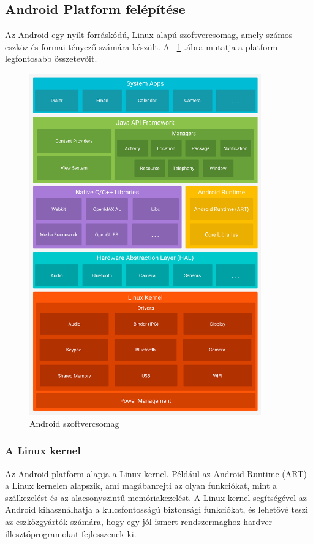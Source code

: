 \documentclass[../main.tex]{subfiles}
\begin{document}
    \subsection{Android Platform felépítése} %
        Az Android egy nyílt forráskódú, Linux alapú szoftvercsomag, amely számos eszköz és formai tényező számára készült. A ~\ref{fig:android_szoftvercsomag} .ábra mutatja a platform legfontosabb összetevőit.
        \begin{figure}[h!]
            \centering
            \includegraphics[width=10cm]{android_res/android_szoftvercsomag.png}
            \caption{Android szoftvercsomag}
            \label{fig:android_szoftvercsomag}
        \end{figure}
        
        \subsubsection{A Linux kernel}
            Az Android platform alapja a Linux kernel. Például az Android Runtime (ART) a Linux kernelen alapszik, ami magábanrejti az olyan funkciókat, mint a szálkezelést és az alacsonyszintű memóriakezelést.
            A Linux kernel segítségével az Android kihasználhatja a kulcsfontosságú biztonsági funkciókat, és lehetővé teszi az eszközgyártók számára, hogy egy jól ismert rendszermaghoz hardver-illesztőprogramokat fejlesszenek ki.
            
\end{document}
